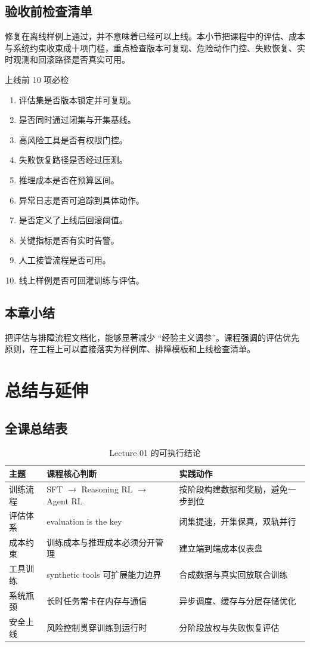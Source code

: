 \documentclass[a4paper]{article}
\begin{document}
\subsection{验收前检查清单}
修复在离线样例上通过，并不意味着已经可以上线。本小节把课程中的评估、成本与系统约束收束成十项门槛，重点检查版本可复现、危险动作门控、失败恢复、实时观测和回滚路径是否真实可用。
\begin{importantbox}{上线前 10 项必检}
\begin{enumerate}
    \item 评估集是否版本锁定并可复现。
    \item 是否同时通过闭集与开集基线。
    \item 高风险工具是否有权限门控。
    \item 失败恢复路径是否经过压测。
    \item 推理成本是否在预算区间。
    \item 异常日志是否可追踪到具体动作。
    \item 是否定义了上线后回滚阈值。
    \item 关键指标是否有实时告警。
    \item 人工接管流程是否可用。
    \item 线上样例是否可回灌训练与评估。
\end{enumerate}
\end{importantbox}

\subsection{本章小结}
把评估与排障流程文档化，能够显著减少 ``经验主义调参''。课程强调的评估优先原则，在工程上可以直接落实为样例库、排障模板和上线检查清单。


\section{总结与延伸}

\subsection{全课总结表}
\begin{table}[H]
\centering
\begin{tabular}{p{2.9cm}p{4.3cm}p{4.5cm}}
\toprule
\textbf{主题} & \textbf{课程核心判断} & \textbf{实践动作} \\
\midrule
训练流程 & SFT $\rightarrow$ Reasoning RL $\rightarrow$ Agent RL & 按阶段构建数据和奖励，避免一步到位 \\
评估体系 & evaluation is the key & 闭集提速，开集保真，双轨并行 \\
成本约束 & 训练成本与推理成本必须分开管理 & 建立端到端成本仪表盘 \\
工具训练 & synthetic tools 可扩展能力边界 & 合成数据与真实回放联合训练 \\
系统瓶颈 & 长时任务常卡在内存与通信 & 异步调度、缓存与分层存储优化 \\
安全上线 & 风险控制贯穿训练到运行时 & 分阶段放权与失败恢复评估 \\
\bottomrule
\end{tabular}
\caption{Lecture 01 的可执行结论}
\end{table}
\end{document}
